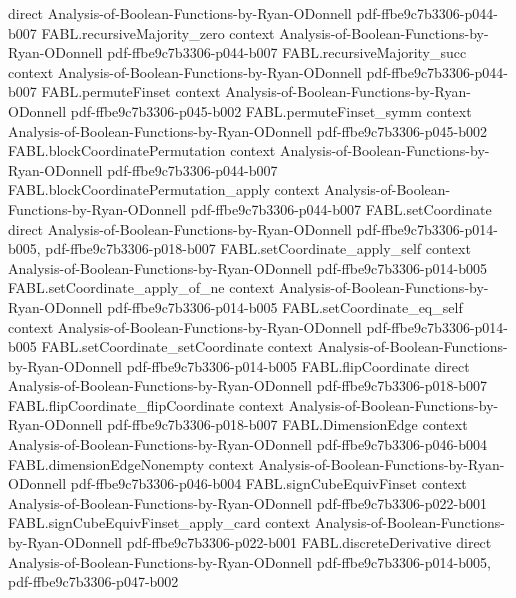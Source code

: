 \begin{theorem}
  {direct}
  {Analysis-of-Boolean-Functions-by-Ryan-ODonnell}
  {pdf-ffbe9c7b3306-p044-b007}
\proofstep
  {FABL.recursiveMajority_zero}
  {context}
  {Analysis-of-Boolean-Functions-by-Ryan-ODonnell}
  {pdf-ffbe9c7b3306-p044-b007}
\proofstep
  {FABL.recursiveMajority_succ}
  {context}
  {Analysis-of-Boolean-Functions-by-Ryan-ODonnell}
  {pdf-ffbe9c7b3306-p044-b007}
\proofstep
  {FABL.permuteFinset}
  {context}
  {Analysis-of-Boolean-Functions-by-Ryan-ODonnell}
  {pdf-ffbe9c7b3306-p045-b002}
\proofstep
  {FABL.permuteFinset_symm}
  {context}
  {Analysis-of-Boolean-Functions-by-Ryan-ODonnell}
  {pdf-ffbe9c7b3306-p045-b002}
\proofstep
  {FABL.blockCoordinatePermutation}
  {context}
  {Analysis-of-Boolean-Functions-by-Ryan-ODonnell}
  {pdf-ffbe9c7b3306-p044-b007}
\proofstep
  {FABL.blockCoordinatePermutation_apply}
  {context}
  {Analysis-of-Boolean-Functions-by-Ryan-ODonnell}
  {pdf-ffbe9c7b3306-p044-b007}
\proofstep
  {FABL.setCoordinate}
  {direct}
  {Analysis-of-Boolean-Functions-by-Ryan-ODonnell}
  {pdf-ffbe9c7b3306-p014-b005,
    pdf-ffbe9c7b3306-p018-b007}
\proofstep
  {FABL.setCoordinate_apply_self}
  {context}
  {Analysis-of-Boolean-Functions-by-Ryan-ODonnell}
  {pdf-ffbe9c7b3306-p014-b005}
\proofstep
  {FABL.setCoordinate_apply_of_ne}
  {context}
  {Analysis-of-Boolean-Functions-by-Ryan-ODonnell}
  {pdf-ffbe9c7b3306-p014-b005}
\proofstep
  {FABL.setCoordinate_eq_self}
  {context}
  {Analysis-of-Boolean-Functions-by-Ryan-ODonnell}
  {pdf-ffbe9c7b3306-p014-b005}
\proofstep
  {FABL.setCoordinate_setCoordinate}
  {context}
  {Analysis-of-Boolean-Functions-by-Ryan-ODonnell}
  {pdf-ffbe9c7b3306-p014-b005}
\proofstep
  {FABL.flipCoordinate}
  {direct}
  {Analysis-of-Boolean-Functions-by-Ryan-ODonnell}
  {pdf-ffbe9c7b3306-p018-b007}
\proofstep
  {FABL.flipCoordinate_flipCoordinate}
  {context}
  {Analysis-of-Boolean-Functions-by-Ryan-ODonnell}
  {pdf-ffbe9c7b3306-p018-b007}
\proofstep
  {FABL.DimensionEdge}
  {context}
  {Analysis-of-Boolean-Functions-by-Ryan-ODonnell}
  {pdf-ffbe9c7b3306-p046-b004}
\proofstep
  {FABL.dimensionEdgeNonempty}
  {context}
  {Analysis-of-Boolean-Functions-by-Ryan-ODonnell}
  {pdf-ffbe9c7b3306-p046-b004}
\proofstep
  {FABL.signCubeEquivFinset}
  {context}
  {Analysis-of-Boolean-Functions-by-Ryan-ODonnell}
  {pdf-ffbe9c7b3306-p022-b001}
\proofstep
  {FABL.signCubeEquivFinset_apply_card}
  {context}
  {Analysis-of-Boolean-Functions-by-Ryan-ODonnell}
  {pdf-ffbe9c7b3306-p022-b001}
\proofstep
  {FABL.discreteDerivative}
  {direct}
  {Analysis-of-Boolean-Functions-by-Ryan-ODonnell}
  {pdf-ffbe9c7b3306-p014-b005,
    pdf-ffbe9c7b3306-p047-b002}

\end{theorem}
